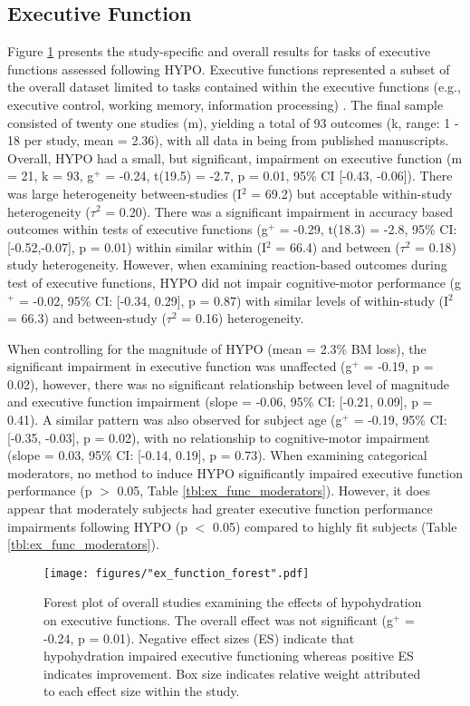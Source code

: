 \subsection{Executive Function}
Figure \ref{fig:ex_func_ma} presents the study-specific and overall results for tasks of executive functions assessed following HYPO. Executive functions represented a subset of the overall dataset limited to tasks contained within the executive functions (e.g., executive control, working memory, information processing) \cite{shields_does_2015}. The final sample consisted of twenty one studies (m), yielding a total of 93 outcomes (k, range: 1 - 18 per study, mean = 2.36), with all data in being from published manuscripts. Overall, HYPO had a small, but significant, impairment on executive function (m = 21, k = 93, g${^+}$ =  -0.24, t(19.5) = -2.7, p = 0.01, 95\% CI [-0.43, -0.06]). There was large heterogeneity between-studies (I${^2}$ = 69.2) but acceptable within-study heterogeneity (${\tau}$${^2}$ = 0.20). There was a significant impairment in accuracy based outcomes within tests of executive functions (g${^+}$ = -0.29, t(18.3) = -2.8, 95\% CI: [-0.52,-0.07], p = 0.01) within similar within (I${^2}$ = 66.4) and between (${\tau}$${^2}$ = 0.18) study heterogeneity. However, when examining reaction-based outcomes during test of executive functions, HYPO did not impair cognitive-motor performance (g${^+}$ = -0.02, 95\% CI: [-0.34, 0.29], p = 0.87) with similar levels of within-study (I${^2}$ = 66.3) and between-study (${\tau}$${^2}$ = 0.16) heterogeneity.

When controlling for the magnitude of HYPO (mean = 2.3\% BM loss), the significant impairment in executive function was unaffected (g${^+}$ =  -0.19, p = 0.02), however, there was no significant relationship between level of magnitude and executive function impairment (slope = -0.06, 95\% CI: [-0.21, 0.09], p = 0.41). A similar pattern was also observed for subject age (g${^+}$ = -0.19, 95\% CI: [-0.35, -0.03], p = 0.02), with no relationship to cognitive-motor impairment (slope = 0.03, 95\% CI: [-0.14, 0.19], p = 0.73). When examining categorical moderators, no method to induce HYPO significantly impaired executive function performance (p ${>}$ 0.05, Table \ref{tbl:ex_func_moderators}). However, it does appear that moderately subjects had greater executive function performance impairments following HYPO (p ${<}$ 0.05) compared to highly fit subjects (Table \ref{tbl:ex_func_moderators}).

\begin{figure}
	\texttt{[image: figures/"ex\_function\_forest".pdf]}
	\caption{Forest plot of overall studies examining the effects of hypohydration on executive functions. The overall effect was not significant (g${^+}$ = -0.24, p = 0.01). Negative effect sizes (ES) indicate that hypohydration impaired executive functioning whereas positive ES indicates improvement. Box size indicates relative weight attributed to each effect size within the study.}
	\label{fig:ex_func_ma}
\end{figure}

